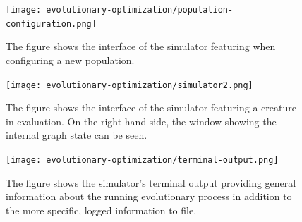 \documentclass[main]{subfiles}
\begin{document}
\begin{figure}[H]
\centering
\hspace*{-6em}
\texttt{[image: evolutionary-optimization/population-configuration.png]}
\caption[The simulator population configuration interface]{The figure shows the interface of the simulator featuring when configuring a new population.}
\label{figure:simulator-population-config}
\end{figure}

\begin{figure}[H]
\centering
\hspace*{-6em}
\texttt{[image: evolutionary-optimization/simulator2.png]}
\caption[The simulator evolution interface]{The figure shows the interface of the simulator featuring a creature in evaluation. On the right-hand side, the window showing the internal graph state can be seen.}
\label{figure:simulator}
\end{figure}

\begin{figure}[H]
\centering
\texttt{[image: evolutionary-optimization/terminal-output.png]}
\caption[The simulator terminal output]{The figure shows the simulator's terminal output providing general information about the running evolutionary process in addition to the more specific, logged information to file.}
\label{figure:simulator-terminal}
\end{figure}
\end{document}
